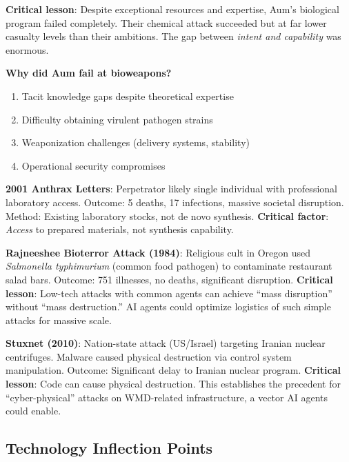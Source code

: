 \documentclass[11pt,letterpaper]{article}
\begin{document}
\textbf{Critical lesson}: Despite exceptional resources and expertise, Aum's biological program failed completely. Their chemical attack succeeded but at far lower casualty levels than their ambitions. The gap between \textit{intent and capability} was enormous.

\textbf{Why did Aum fail at bioweapons?}
\begin{enumerate}[nosep]
  \item Tacit knowledge gaps despite theoretical expertise
  \item Difficulty obtaining virulent pathogen strains
  \item Weaponization challenges (delivery systems, stability)
  \item Operational security compromises
\end{enumerate}

\textbf{2001 Anthrax Letters}: Perpetrator likely single individual with professional laboratory access. Outcome: 5 deaths, 17 infections, massive societal disruption. Method: Existing laboratory stocks, not de novo synthesis. \textbf{Critical factor}: \textit{Access} to prepared materials, not synthesis capability.

\textbf{Rajneeshee Bioterror Attack (1984)}: Religious cult in Oregon used \textit{Salmonella typhimurium} (common food pathogen) to contaminate restaurant salad bars. Outcome: 751 illnesses, no deaths, significant disruption. \textbf{Critical lesson}: Low-tech attacks with common agents can achieve ``mass disruption'' without ``mass destruction.'' AI agents could optimize logistics of such simple attacks for massive scale.

\textbf{Stuxnet (2010)}: Nation-state attack (US/Israel) targeting Iranian nuclear centrifuges. Malware caused physical destruction via control system manipulation. Outcome: Significant delay to Iranian nuclear program. \textbf{Critical lesson}: Code can cause physical destruction. This establishes the precedent for ``cyber-physical'' attacks on WMD-related infrastructure, a vector AI agents could enable.

\subsection{Technology Inflection Points}
\end{document}
